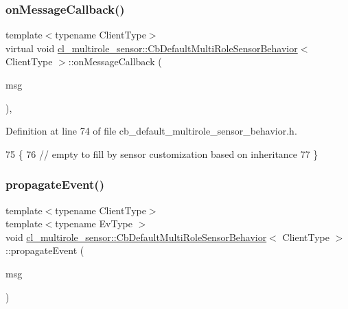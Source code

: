 \subsubsection{\texorpdfstring{on\+Message\+Callback()}{onMessageCallback()}}
{\footnotesize\ttfamily template$<$typename Client\+Type$>$ \\
virtual void \hyperlink{classcl__multirole__sensor_1_1CbDefaultMultiRoleSensorBehavior}{cl\+\_\+multirole\+\_\+sensor\+::\+Cb\+Default\+Multi\+Role\+Sensor\+Behavior}$<$ Client\+Type $>$\+::on\+Message\+Callback (\begin{DoxyParamCaption}\item[{const \hyperlink{classcl__multirole__sensor_1_1CbDefaultMultiRoleSensorBehavior_aa23bc8c99de1eddad01d094bdab62aa4}{T\+Message\+Type} \&}]{msg }\end{DoxyParamCaption})\hspace{0.3cm}{\ttfamily [inline]}, {\ttfamily [virtual]}}



Definition at line 74 of file cb\+\_\+default\+\_\+multirole\+\_\+sensor\+\_\+behavior.\+h.


\begin{DoxyCode}
75   \{
76     \textcolor{comment}{// empty to fill by sensor customization based on inheritance}
77   \}
\end{DoxyCode}
\mbox{\label{classcl__multirole__sensor_1_1CbDefaultMultiRoleSensorBehavior_af0017775207108c81f879fe222a69ea9}} 
\subsubsection{\texorpdfstring{propagate\+Event()}{propagateEvent()}}
{\footnotesize\ttfamily template$<$typename Client\+Type$>$ \\
template$<$typename Ev\+Type $>$ \\
void \hyperlink{classcl__multirole__sensor_1_1CbDefaultMultiRoleSensorBehavior}{cl\+\_\+multirole\+\_\+sensor\+::\+Cb\+Default\+Multi\+Role\+Sensor\+Behavior}$<$ Client\+Type $>$\+::propagate\+Event (\begin{DoxyParamCaption}\item[{const \hyperlink{classcl__multirole__sensor_1_1CbDefaultMultiRoleSensorBehavior_aa23bc8c99de1eddad01d094bdab62aa4}{T\+Message\+Type} \&}]{msg }\end{DoxyParamCaption})\hspace{0.3cm}{\ttfamily [inline]}}



